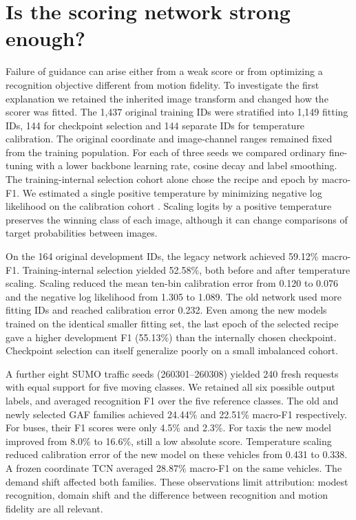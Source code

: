 \section{Is the scoring network strong enough?}
Failure of guidance can arise either from a weak score or from optimizing a recognition objective different from motion fidelity. To investigate the first explanation we retained the inherited image transform and changed how the scorer was fitted. The 1,437 original training IDs were stratified into 1,149 fitting IDs, 144 for checkpoint selection and 144 separate IDs for temperature calibration. The original coordinate and image-channel ranges remained fixed from the training population. For each of three seeds we compared ordinary fine-tuning with a lower backbone learning rate, cosine decay and label smoothing. The training-internal selection cohort alone chose the recipe and epoch by macro-F1. We estimated a single positive temperature by minimizing negative log likelihood on the calibration cohort \cite{calibration}. Scaling logits by a positive temperature preserves the winning class of each image, although it can change comparisons of target probabilities between images.

On the 164 original development IDs, the legacy network achieved 59.12\% macro-F1. Training-internal selection yielded 52.58\%, both before and after temperature scaling. Scaling reduced the mean ten-bin calibration error from 0.120 to 0.076 and the negative log likelihood from 1.305 to 1.089. The old network used more fitting IDs and reached calibration error 0.232. Even among the new models trained on the identical smaller fitting set, the last epoch of the selected recipe gave a higher development F1 (55.13\%) than the internally chosen checkpoint. Checkpoint selection can itself generalize poorly on a small imbalanced cohort.

A further eight SUMO traffic seeds (260301--260308) yielded 240 fresh requests with equal support for five moving classes. We retained all six possible output labels, and averaged recognition F1 over the five reference classes. The old and newly selected GAF families achieved 24.44\% and 22.51\% macro-F1 respectively. For buses, their F1 scores were only 4.5\% and 2.3\%. For taxis the new model improved from 8.0\% to 16.6\%, still a low absolute score. Temperature scaling reduced calibration error of the new model on these vehicles from 0.431 to 0.338. A frozen coordinate TCN averaged 28.87\% macro-F1 on the same vehicles. The demand shift affected both families. These observations limit attribution: modest recognition, domain shift and the difference between recognition and motion fidelity are all relevant.

